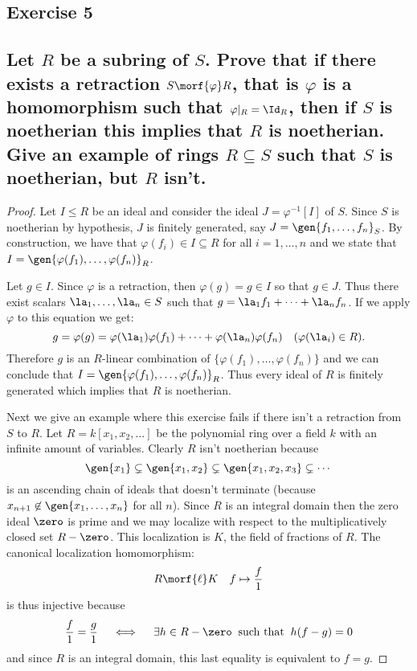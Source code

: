\HRule
\subsection*{Exercise 5}
\subsection*{%
Let $R$ be a subring of $S$. Prove that if there exists a retraction $S\morf{\varphi} R$, that is $\varphi$ is a
homomorphism such that $\varphi|_R=\Id_R$, then if $S$ is noetherian this implies that $R$ is noetherian.
Give an example of rings $R\subseteq S$ such that $S$ is noetherian, but $R$ isn't.
} 

\begin{proof} %

Let $I\leq R$ be an ideal and consider the ideal $J=\varphi^{-1}[I]$ of $S$. Since $S$ is noetherian by hypothesis,
$J$ is finitely generated, say $J=\gen{f_1,\ldots,f_n}_S$. By construction, we have that $\varphi(f_i)\in I\subseteq R$ for all
$i=1,\ldots,n$ and we state that $I=\gen{\varphi(f_1),\ldots,\varphi(f_n)}_R$.

Let $g\in I$. Since $\varphi$ is a retraction, then $\varphi(g)=g\in I$ so that $g\in J$. Thus there exist scalars
$\la_1,\ldots,\la_n\in S$ such that $g=\la_1 f_1 +\cdots +\la_n f_n$. If we apply $\varphi$ to this equation we get:
\[
	g=\varphi(g)=\varphi(\la_1)\varphi(f_1)+\cdots+\varphi(\la_n)\varphi(f_n) \quad (\varphi(\la_i)\in R).
\]
Therefore $g$ is an $R$-linear combination of $\{\varphi(f_1),\ldots,\varphi(f_n)\}$ and we can conclude that
$I=\gen{\varphi(f_1),\ldots,\varphi(f_n)}_R$. Thus every ideal of $R$ is finitely generated which implies that $R$ is noetherian.

Next we give an example where this exercise fails if there isn't a retraction from $S$ to $R$. Let $R=k[x_1,x_2,\ldots]$ be
the polynomial ring over a field $k$ with an infinite amount of variables. Clearly $R$ isn't noetherian because
\[
	\gen{x_1} \subsetneq \gen{x_1,x_2} \subsetneq \gen{x_1,x_2,x_3} \subsetneq \cdots
\]
is an ascending chain of ideals that doesn't terminate (because $x_{n+1}\not\in \gen{x_1,\ldots,x_n}$ for all $n$).
Since $R$ is an integral domain then the zero ideal $\zero$ is prime and we may localize with respect to the multiplicatively
closed set $R-\zero$. This localization is $K$, the field of fractions of $R$. The canonical localization homomorphism:
\[
	R\morf{\ell} K \quad f\mapsto \frac{f}{1}
\]
is thus injective because
\[
	\frac{f}{1}=\frac{g}{1} \quad\iff\quad \exists h\in R-\zero \;\;\text{such that}\;\; h(f-g)=0
\]
and since $R$ is an integral domain, this last equality is equivalent to $f=g$.


\end{proof}
